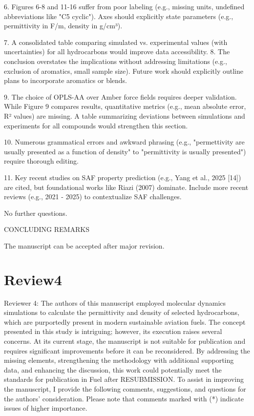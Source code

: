 \documentclass{article}
\begin{document}
6. Figures 6-8 and 11-16 suffer from poor labeling (e.g., missing units, undefined abbreviations like "C5 cyclic"). Axes should explicitly state parameters (e.g., permittivity in F/m, density in g/cm³).

7. A consolidated table comparing simulated vs. experimental values (with uncertainties) for all hydrocarbons would improve data accessibility.
8. The conclusion overstates the implications without addressing limitations (e.g., exclusion of aromatics, small sample size). Future work should explicitly outline plans to incorporate aromatics or blends.

9. The choice of OPLS-AA over Amber force fields requires deeper validation. While Figure 9 compares results, quantitative metrics (e.g., mean absolute error, R² values) are missing. A table summarizing deviations between simulations and experiments for all compounds would strengthen this section.

10. Numerous grammatical errors and awkward phrasing (e.g., "permettivity are usually presented as a function of density" to "permittivity is usually presented") require thorough editing.

11. Key recent studies on SAF property prediction (e.g., Yang et al., 2025 [14]) are cited, but foundational works like Riazi (2007) dominate. Include more recent reviews (e.g., 2021 - 2025) to contextualize SAF challenges.

No further questions.

CONCLUDING REMARKS

The manuscript can be accepted after major revision.

\section{Review4}

Reviewer 4: The authors of this manuscript employed molecular dynamics simulations to calculate the permittivity and density of selected hydrocarbons, which are purportedly present in modern sustainable aviation fuels. The concept presented in this study is intriguing; however, its execution raises several concerns.
At its current stage, the manuscript is not suitable for publication and requires significant improvements before it can be reconsidered. By addressing the missing elements, strengthening the methodology with additional supporting data, and enhancing the discussion, this work could potentially meet the standards for publication in Fuel after RESUBMISSION.
To assist in improving the manuscript, I provide the following comments, suggestions, and questions for the authors' consideration. Please note that comments marked with (*) indicate issues of higher importance.
\end{document}
